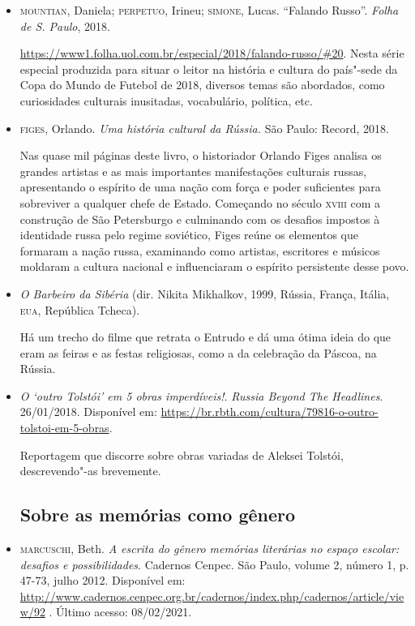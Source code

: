\documentclass{article}
\begin{document}
\begin{itemize}
\item\textsc{mountian}, Daniela; \textsc{perpetuo}, Irineu; \textsc{simone}, Lucas. ``Falando Russo''. \emph{Folha de S. Paulo}, 2018.

\url{https://www1.folha.uol.com.br/especial/2018/falando-russo/\#20}.
Nesta série especial produzida para situar o leitor na história e
cultura do país"-sede da Copa do Mundo de Futebol de 2018, diversos temas
são abordados, como curiosidades culturais inusitadas, vocabulário,
política, etc.

\item\textsc{figes}, Orlando. \emph{Uma história cultural da Rússia.} São Paulo:
Record, 2018. 

Nas quase mil páginas deste livro, o historiador
Orlando Figes analisa os grandes artistas e as mais importantes
manifestações culturais russas, apresentando o espírito de uma nação com
força e poder suficientes para sobreviver a qualquer chefe de Estado.
Começando no século \textsc{xviii} com a construção de São Petersburgo e
culminando com os desafios impostos à identidade russa pelo regime
soviético, Figes reúne os elementos que formaram a nação russa,
examinando como artistas, escritores e músicos moldaram a cultura
nacional e influenciaram o espírito persistente desse povo.

\item\emph{O Barbeiro da Sibéria} (dir. Nikita Mikhalkov, 1999, Rússia,
França, Itália, \textsc{eua}, República Tcheca).

Há um trecho do filme que
retrata o Entrudo e dá uma ótima ideia do que eram as feiras e as festas
religiosas, como a da celebração da Páscoa, na Rússia.

\item\emph{O `outro Tolstói' em 5 obras imperdíveis!}. \emph{Russia Beyond
The Headlines}. 26/01/2018. Disponível em:
\url{https://br.rbth.com/cultura/79816-o-outro-tolstoi-em-5-obras}.


Reportagem que discorre sobre obras variadas de Aleksei Tolstói,
descrevendo"-as brevemente.

\subsection{Sobre as memórias como gênero}

\item\textsc{marcuschi}, Beth. \emph{A escrita do gênero memórias literárias no espaço escolar: desafios e possibilidades}. Cadernos Cenpec. São Paulo, volume
2, número 1, p. 47-73, julho 2012. Disponível em:
\url{http://www.cadernos.cenpec.org.br/cadernos/index.php/cadernos/article/view/92}
. Último acesso: 08/02/2021.


\end{itemize}
\end{document}
